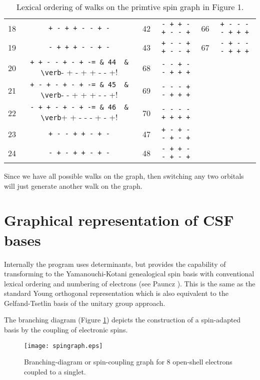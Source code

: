 \documentclass[fullpage,12pt,fleqn]{article}
\begin{document}
\begin{table}[htbp]
\begin{tabular}{lc|lc|lc}
18 &  \verb!+ - + + - - + -! & 42  &  \verb!- + + - + - - +!    & 66 &
\verb!+ - - - - + + +! \\
19 &  \verb!- + + + - - + -! & 43  &  \verb!+ - - + + - - +!    & 67 &
\verb!- + - - - + + +! \\
20 &  \verb!+ + - - + - + -= & 44  &  \verb!- + - + + - - +!    & 68 &
\verb!- - + - - + + +! \\
21 &  \verb!+ - + - + - + -= & 45  &  \verb!- - + + + - - +!    & 69 &
\verb!- - - + - + + +! \\
22 &  \verb!- + + - + - + -= & 46  &  \verb!+ + - - - + - +!    & 70 &
\verb!- - - - + + + +! \\
23 & \verb!+ - - + + - + -! & 47 & \verb!+ - + - - + - +! & \\
24 & \verb!- + - + + - + -! & 48 & \verb!- + + - - + - +! & \\ \hline
\end{tabular}

\caption{\label{mwalks} Lexical ordering of walks on the primtive spin
graph in Figure 1.}
\end{table}

Since we have all possible walks on the graph, then switching any two
orbitals will just generate another walk on the graph.

\section{Graphical representation of CSF bases}

Internally the program uses determinants, but provides the capability
of transforming to the Yamanouchi-Kotani \cite{kotani} genealogical
spin basis with conventional lexical ordering and numbering of
electrons (see Pauncz \cite{pauncz}).  This is the same as the
standard Young orthogonal representation which is also equivalent to
the Gelfand-Tsetlin basis of the unitary group approach.

The branching diagram (Figure \ref{sgraph}) depicts the construction
of a spin-adapted basis by the coupling of electronic spins.

\begin{figure}[htbp]

\center

\texttt{[image: spingraph.eps]}
\caption{\label{sgraph} Branching-diagram or spin-coupling graph for 8
open-shell electrons coupled to a singlet.}
\end{figure}
\end{document}
